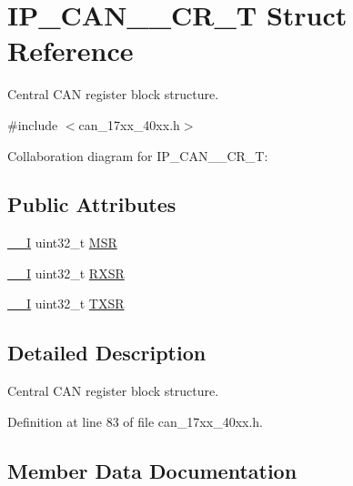 \hypertarget{structIP__CAN__001__CR__T}{}\section{I\+P\+\_\+\+C\+A\+N\+\_\+\_\+\+C\+R\+\_\+T Struct Reference}
\label{structIP__CAN__001__CR__T}


Central C\+AN register block structure.  




{\ttfamily \#include $<$can\+\_\+17xx\+\_\+40xx.\+h$>$}



Collaboration diagram for I\+P\+\_\+\+C\+A\+N\+\_\+\_\+\+C\+R\+\_\+T\+:
\subsection*{Public Attributes}
\begin{DoxyCompactItemize}
\item 
\hyperlink{core__cm3_8h_af63697ed9952cc71e1225efe205f6cd3}{\+\_\+\+\_\+I} uint32\+\_\+t \hyperlink{structIP__CAN__001__CR__T_a4cfec80b7875ddddf16f1b7284280423}{M\+SR}
\item 
\hyperlink{core__cm3_8h_af63697ed9952cc71e1225efe205f6cd3}{\+\_\+\+\_\+I} uint32\+\_\+t \hyperlink{structIP__CAN__001__CR__T_a421bed687294a71ec89ece1ea01fc808}{R\+X\+SR}
\item 
\hyperlink{core__cm3_8h_af63697ed9952cc71e1225efe205f6cd3}{\+\_\+\+\_\+I} uint32\+\_\+t \hyperlink{structIP__CAN__001__CR__T_a7ce56eda4c7eabebb9597b8b9cd418ac}{T\+X\+SR}
\end{DoxyCompactItemize}


\subsection{Detailed Description}
Central C\+AN register block structure. 

Definition at line 83 of file can\+\_\+17xx\+\_\+40xx.\+h.



\subsection{Member Data Documentation}

